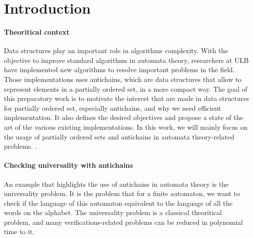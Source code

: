 \documentclass[letterpaper]{article}
\theoremstyle{definition}
\begin{document}
%



\newpage

\tableofcontents

\newpage

\listoftodos

\newpage

\section{Introduction}

\paragraph{Theoritical context}

Data structures play an important role in algorithms complexity.
With the objective to improve standard algorithms in automata theory,
researchers at ULB
have implemented new algorithms to resolve
important problems in the field. Those implementations uses antichains,
which are data structures that allow to represent elements in a partially
ordered set, in a more compact way.
The goal of this preparatory work is to motivate the interest that
are made in data structures for partially ordered set, especially antichains,
and why we need efficient
implementation.
It also defines the desired objectives
and propose a state of the art of the various existing implementations.
In this work, we will mainly focus
on the usage of partially ordered sets and antichains in
automata theory-related problems.
.

\paragraph{Checking universality with antichains}

An example that highlights the use of antichains in automata theory is
the universality problem.
It is the problem that for a finite automaton, we want to
check if the language of this automaton equivalent to the language
of all the words on the alphabet. The universality problem is a classical
theoritical problem, and many verifications-related problems can be
reduced in polynomial time to it.
\end{document}
